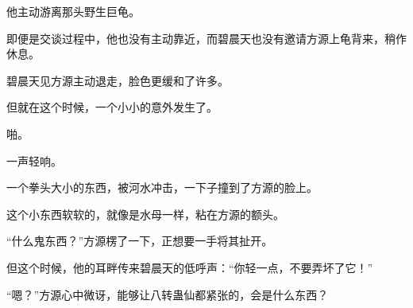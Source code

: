 \begin{this_body}
他主动游离那头野生巨龟。

即便是交谈过程中，他也没有主动靠近，而碧晨天也没有邀请方源上龟背来，稍作休息。

碧晨天见方源主动退走，脸色更缓和了许多。

但就在这个时候，一个小小的意外发生了。

啪。

一声轻响。

一个拳头大小的东西，被河水冲击，一下子撞到了方源的脸上。

这个小东西软软的，就像是水母一样，粘在方源的额头。

“什么鬼东西？”方源楞了一下，正想要一手将其扯开。

但这个时候，他的耳畔传来碧晨天的低呼声：“你轻一点，不要弄坏了它！”

“嗯？”方源心中微讶，能够让八转蛊仙都紧张的，会是什么东西？

\end{this_body}


